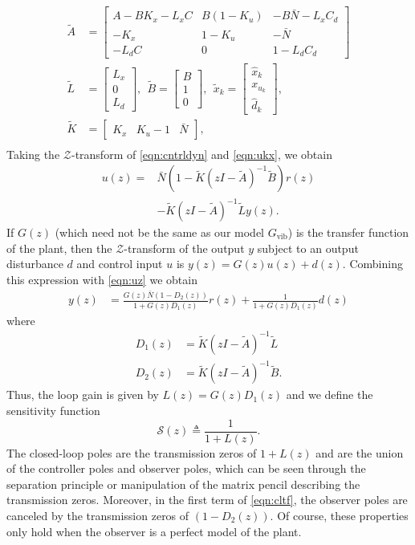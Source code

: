 \documentclass[twocolumn,twoside]{IEEEtran}
\newcommand{\Gv}{\ensuremath{G_{\text{vib}}}\xspace}
\begin{document}
\begin{align*}
  \tilde{A} &= \begin{bmatrix}
    A-BK_x-L_xC & B(1-K_u) & -B\bar{N} - L_xC_d\\
    -K_x        & 1-K_u    & -\bar{N} \\
    -L_dC      & 0        & 1-L_dC_d
  \end{bmatrix}\\
  \tilde{L} &= \begin{bmatrix} L_x \\ 0 \\ L_d  \end{bmatrix},\:\:
  \tilde{B} = \begin{bmatrix} B \\ 1 \\0\end{bmatrix},\:\:
  \tilde{x}_k = \begin{bmatrix} \hat{x}_k \\ x_{u_k} \\ \hat{d}_k\end{bmatrix},\\
  \tilde{K} &= \begin{bmatrix}K_x & K_u-1 & \bar{N}\end{bmatrix},\\
\end{align*}
Taking the $\mathcal{Z}$-transform of \eqref{eqn:cntrldyn} and \eqref{eqn:ukx}, we obtain
\begin{align}
  u(z) =&  \bar{N}(1-\tilde{K}(zI-\tilde{A})^{-1}\tilde{B})r(z) \nonumber\\
       & -\tilde{K}(zI - \tilde{A})^{-1}\tilde{L}y(z).\label{eqn:uz}
\end{align}
If $G(z)$ (which need not be the same as our model $\Gv$) is the transfer function of the plant, then the $\mathcal{Z}$-transform of the output $y$ subject to an output disturbance $d$ and control input $u$ is $y(z) = G(z)u(z) + d(z)$. Combining this expression with \eqref{eqn:uz} we obtain 
\begin{align}
  y(z) &= \frac{G(z)\bar{N}(1-D_2(z))}{1 + G(z)D_1(z)} r(z) + \frac{1}{1 + G(z)D_1(z)}d(z)\label{eqn:cltf}
\end{align}
where
\begin{align*}
  D_1(z) &= \tilde{K}(zI -\tilde{A})^{-1}\tilde{L}\\
  D_2(z) &= \tilde{K}(zI -\tilde{A})^{-1}\tilde{B}.
\end{align*}
Thus, the loop gain is given by $L(z) = G(z)D_1(z)$ and we define the sensitivity function
\begin{equation}
  \mathcal{S}(z)\triangleq \frac{1}{1+L(z)}.\label{eqn:Sens}
\end{equation}
The closed-loop poles are the transmission zeros of $1+L(z)$ and are the union of the controller poles and observer poles, which can be seen through the separation principle or manipulation of the matrix pencil describing the transmission zeros. Moreover, in the first term of \eqref{eqn:cltf}, the observer poles are canceled by the transmission zeros of $(1-D_2(z))$. Of course, these properties only hold when the observer is a perfect model of the plant. 
\end{document}
